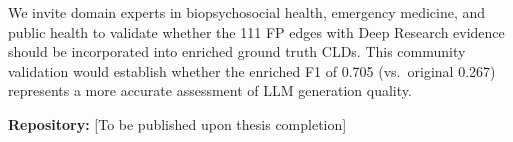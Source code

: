 \vspace{0.5em}
We invite domain experts in biopsychosocial health, emergency medicine, and public health to validate whether the 111 FP edges with Deep Research evidence should be incorporated into enriched ground truth CLDs. This community validation would establish whether the enriched F1 of 0.705 (vs.\ original 0.267) represents a more accurate assessment of LLM generation quality.

\textbf{Repository:} [To be published upon thesis completion]



